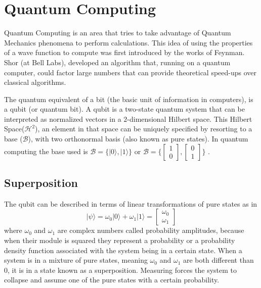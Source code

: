 

\clearpage
\section{Quantum Computing}
\label{sec:int_quantum_computing}



Quantum Computing is an area that tries to take advantage of Quantum Mechanics phenomena to perform calculations. This idea of using the properties of a wave function to compute was first introduced by the works of Feynman\cite{Feynman1982}. Shor (at Bell Labs), developed an algorithm that, running on a quantum computer, could factor large numbers that can provide theoretical speed-ups over classical algorithms\cite{Rieffel2011}.  

The quantum equivalent of a bit (the basic unit of information in computers), is a qubit (or quantum bit). A qubit is a two-state quantum system that can be interpreted as normalized vectors in a $2$-dimensional Hilbert space. This Hilbert Space($\mathcal{H}^2$), an element in that space can be uniquely specified by resorting to a base ($\mathcal{B}$), with two orthonormal basis (also known as pure states). In quantum computing the base used is $\mathcal{B}=\{ \vert 0 \rangle , \vert 1 \rangle \}$ or $\mathcal{B}= \{ \left[\begin{array}{c}
1\\
0
\end{array}\right]
,  
\left[\begin{array}{c}
0\\
1
\end{array}\right] \}$ .

\subsection{Superposition}
\label{subsec:superposition}

The qubit can be described in terms of linear transformations of pure states as in 
\begin{equation}
\label{qubit}
\vert \psi \rangle = \omega_{0}\vert0\rangle+\omega_{1}\vert1\rangle = \left[\begin{array}{c}
\omega_{0}\\
\omega_{1}
\end{array}\right]
\end{equation}
where $\omega_{0}$ and $\omega_{1}$ are complex numbers called probability amplitudes, because when their module is squared they represent a probability or a probability density function associated with the system being in a certain state. When a system is in a mixture of pure states, meaning $\omega_{0}$ and $\omega_{1}$ are both different than $0$, it is in a state known as a superposition. 
Measuring forces the system to collapse and assume one of the pure states with a certain probability. 



